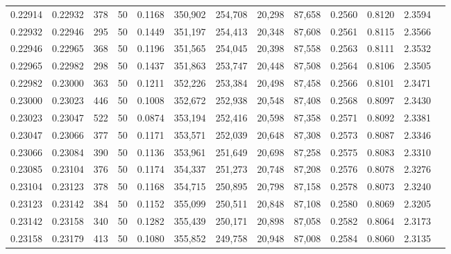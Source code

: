 \begin{tabular}{rrrrrrrrrrrrr}
0.22914 & 0.22932 &   378 &  50 &                                     0.1168 & 350,902 & 254,708 &  20,298 &  87,658 & 0.2560 & 0.8120 & 2.3594 \\
0.22932 & 0.22946 &   295 &  50 &                                     0.1449 & 351,197 & 254,413 &  20,348 &  87,608 & 0.2561 & 0.8115 & 2.3566 \\
0.22946 & 0.22965 &   368 &  50 &                                     0.1196 & 351,565 & 254,045 &  20,398 &  87,558 & 0.2563 & 0.8111 & 2.3532 \\
0.22965 & 0.22982 &   298 &  50 &                                     0.1437 & 351,863 & 253,747 &  20,448 &  87,508 & 0.2564 & 0.8106 & 2.3505 \\
0.22982 & 0.23000 &   363 &  50 &                                     0.1211 & 352,226 & 253,384 &  20,498 &  87,458 & 0.2566 & 0.8101 & 2.3471 \\
0.23000 & 0.23023 &   446 &  50 &                                     0.1008 & 352,672 & 252,938 &  20,548 &  87,408 & 0.2568 & 0.8097 & 2.3430 \\
0.23023 & 0.23047 &   522 &  50 &                                     0.0874 & 353,194 & 252,416 &  20,598 &  87,358 & 0.2571 & 0.8092 & 2.3381 \\
0.23047 & 0.23066 &   377 &  50 &                                     0.1171 & 353,571 & 252,039 &  20,648 &  87,308 & 0.2573 & 0.8087 & 2.3346 \\
0.23066 & 0.23084 &   390 &  50 &                                     0.1136 & 353,961 & 251,649 &  20,698 &  87,258 & 0.2575 & 0.8083 & 2.3310 \\
0.23085 & 0.23104 &   376 &  50 &                                     0.1174 & 354,337 & 251,273 &  20,748 &  87,208 & 0.2576 & 0.8078 & 2.3276 \\
0.23104 & 0.23123 &   378 &  50 &                                     0.1168 & 354,715 & 250,895 &  20,798 &  87,158 & 0.2578 & 0.8073 & 2.3240 \\
0.23123 & 0.23142 &   384 &  50 &                                     0.1152 & 355,099 & 250,511 &  20,848 &  87,108 & 0.2580 & 0.8069 & 2.3205 \\
0.23142 & 0.23158 &   340 &  50 &                                     0.1282 & 355,439 & 250,171 &  20,898 &  87,058 & 0.2582 & 0.8064 & 2.3173 \\
0.23158 & 0.23179 &   413 &  50 &                                     0.1080 & 355,852 & 249,758 &  20,948 &  87,008 & 0.2584 & 0.8060 & 2.3135 \\

\end{tabular}
